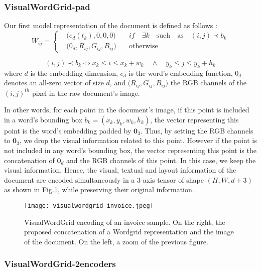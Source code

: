 \documentclass[runningheads]{llncs}
\begin{document}
\subsubsection{VisualWordGrid-pad}\hfill

Our first model representation of the document is defined as follows :
 \begin{equation}
    W_{ij}=\left\{\begin{array}{rcl}
    & (e_d(t_k), 0, 0, 0 \big) \quad & if \quad \exists k \quad \text{such} \quad \text{as} \quad (i,j) \prec b_k \\
    & (0_d, R_{ij},G_{ij}, B_{ij}\big)  \quad & \text{otherwise}
\end{array}\right.
\label{eq1}
\end{equation}

$$ (i,j) \prec b_k  \iff   x_k \leq i \leq x_k + w_k \quad  \wedge \quad  y_k \leq j \leq y_k + h_k$$
where $d$ is the embedding dimension, $e_d$ is the  word's embedding function, $0_d$ denotes an all-zero vector of size $d$, and $\big(R_{ij},G_{ij}, B_{ij}\big)$ the RGB channels of the $(i,j)^{th}$ pixel in the raw document's image. 

In other words, for each point in the document's image, if this point is included in a word's bounding box $b_k = (x_k, y_k, w_k, h_k)$, the vector representing this point is the word's embedding padded by $\mathbf{0}_3$. Thus, by setting the RGB channels to $\mathbf{0}_3$, we drop the visual information related to this point. However if the point is not included in any word's bounding box, the vector representing this point is the concatenation of $\mathbf{0}_d$ and the RGB channels of this point. In this case, we keep the visual information.
Hence, the visual, textual and layout information of the document are encoded simultaneously in a 3-axis tensor of shape $( H, W, d+3)$ as shown in Fig.\ref{fig:visualwordgrid}, while preserving their original information.

\begin{figure}[!h]
\centering
\texttt{[image: visualwordgrid\_invoice.jpeg]}
\caption{VisualWordGrid encoding of an invoice sample. On the right, the proposed concatenation of a Wordgrid representation  and the image of the document. On the left, a zoom of the previous figure.}
\label{fig:visualwordgrid}  
\end{figure}

\subsubsection{VisualWordGrid-2encoders}\hfill
\end{document}
